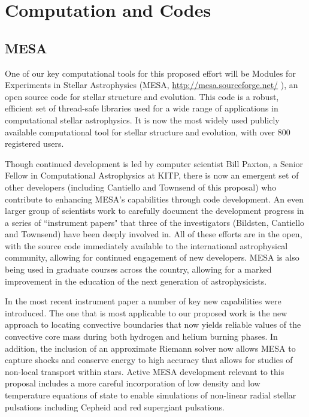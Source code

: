 \section{Computation and Codes}
    
    
{\color{green}    
\subsection{MESA}
}


One of our key computational tools for this proposed effort will be
Modules for Experiments in Stellar Astrophysics (MESA, \href{http://mesa.sourceforge.net/}{http://mesa.sourceforge.net/}
), an open source code for stellar
structure and evolution. This code is a robust, efficient set of
thread-safe libraries used for a wide range of applications in
computational stellar astrophysics. It is now the most widely used
publicly available computational tool for stellar structure and
evolution, with over 800 registered users.

Though continued development is led by computer scientist Bill Paxton,
a Senior Fellow in Computational Astrophysics at KITP, there is now an
emergent set of other developers (including Cantiello and Townsend of
this proposal) who contribute to enhancing MESA's capabilities through
code development. An even larger group of scientists work to carefully
document the development progress in a series of ``instrument papers" \cite{Paxton2010,Paxton2013,Paxton2015,2017arXiv171008424P}
 that three of the investigators
(Bildsten, Cantiello and Townsend) have been deeply involved in.  All
of these efforts are in the open, with the source code immediately
available to the international astrophysical community, allowing for
continued engagement of new developers. MESA is also being used in
graduate courses across the country, allowing for a marked improvement
in the education of the next generation of astrophysicists.

In the most recent instrument paper \citep{2017arXiv171008424P} a number of
key new capabilities were introduced. The one that is most applicable
to our proposed work is the new approach to locating convective
boundaries that now yields reliable values of the convective core mass
during both hydrogen and helium burning phases. In addition, the
inclusion of an approximate Riemann solver now allows MESA to capture
shocks and conserve energy to high accuracy that allows for studies of
non-local transport within stars. Active MESA development relevant to
this proposal includes a more careful incorporation of low density and
low temperature equations of state to enable simulations of
non-linear radial stellar pulsations including Cepheid and red supergiant pulsations.

